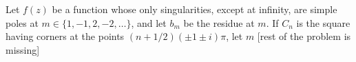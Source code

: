 Let $f(z)$ be a function whose only singularities, except at infinity,
are simple poles at $m\in \{1,-1,2,-2,\ldots \}$, and let $b_m$ be the
residue at $m$. If $C_n$ is the square having corners at the points
$(n+1/2)(\pm 1\pm i)\pi$, let $m$ [rest of the problem is missing]

